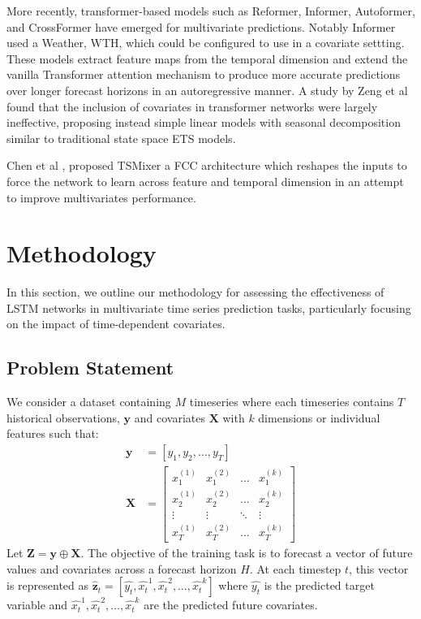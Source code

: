 \documentclass[letterpaper]{article}
\newcommand{\horizon}{H}
\newcommand{\timeserieslength}{T}
\newcommand{\datasettscount}{M}
\begin{document}
More recently, transformer-based models such as Reformer, Informer, Autoformer, and CrossFormer
\cite{kitaev2020reformer,zhou2021informer,wu2022autoformer, zhang2023crossformer} have emerged for multivariate predictions. Notably Informer used a 
Weather, WTH,  which could be configured to use in a covariate settting. These models extract feature maps from the temporal dimension and extend the 
vanilla Transformer attention mechanism to produce more accurate predictions over longer forecast horizons in an autoregressive manner. 
A study by Zeng et al \cite{zeng2022transformers} found that the inclusion of covariates in transformer networks were largely ineffective, proposing instead 
simple linear models with seasonal decomposition similar to traditional state space ETS models.

Chen et al \cite{chen2023tsmixer}, proposed TSMixer a FCC architecture which reshapes the inputs to force the network to learn across feature and temporal dimension in an 
attempt to improve multivariates performance.

\section{Methodology}
In this section, we outline our methodology for assessing the effectiveness of LSTM networks in 
multivariate time series prediction tasks, particularly focusing on the impact of time-dependent covariates.

\subsection{Problem Statement}
We consider a dataset containing $\datasettscount$ timeseries where each timeseries contains $\timeserieslength$ historical observations, $\mathbf{y}$ 
and covariates $\mathbf{X}$ with $k$ dimensions or individual features such that:
\begin{align*}
\mathbf{y} &= [y_1, y_2, \dots, y_T] \\
\mathbf{X} &= \begin{bmatrix}
x_1^{(1)} & x_1^{(2)} & \ldots & x_1^{(k)} \\
x_2^{(1)} & x_2^{(2)} & \ldots & x_2^{(k)} \\
\vdots & \vdots & \ddots & \vdots \\
x_T^{(1)} & x_T^{(2)} & \ldots & x_T^{(k)}
\end{bmatrix}
\end{align*}
Let $\mathbf{Z} = \mathbf{y} \oplus \mathbf{X}$. The objective of the training task is to forecast a vector of future values and covariates across a forecast horizon $\horizon$. 
At each timestep $t$, this vector is represented as ${\mathbf{\hat{z}}_t} = [\hat{y_t}, \hat{x_t}^1, \hat{x_t}^2, \dots, \hat{x_t}^k]$ where $\hat{y_t}$ is the predicted target variable
and $\hat{x_t}^1, \hat{x_t}^2, \dots, \hat{x_t}^k$ are the predicted future covariates. 
\end{document}
